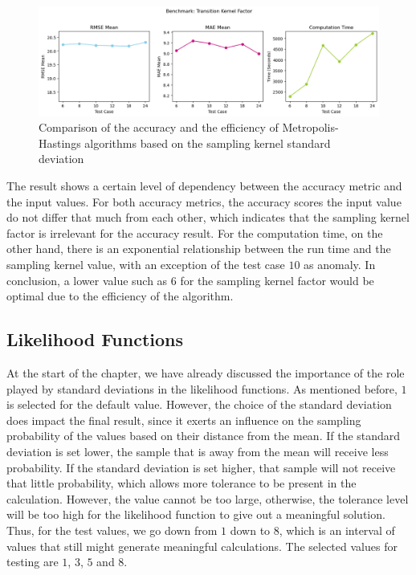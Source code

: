 \begin{figure}[H]
    \centering
    \includegraphics[width=1\textwidth]{figures/basic_mh/benchmark/sensitivity_transition.png}
    \captionsetup{width=.8\textwidth}
    \caption{Comparison of the accuracy and the efficiency of Metropolis-Hastings algorithms based on the sampling kernel standard deviation}
    \label{fig:enter-label}
\end{figure}

The result shows a certain level of dependency between the accuracy metric and the input values. For both accuracy metrics, the accuracy scores the input value do not differ that much from each other, which indicates that the sampling kernel factor is irrelevant for the accuracy result. For the computation time, on the other hand, there is an exponential relationship between the run time and the sampling kernel value, with an exception of the test case $10$ as anomaly. In conclusion, a lower value such as $6$ for the sampling kernel factor would be optimal due to the efficiency of the algorithm.

\subsection{Likelihood Functions}
At the start of the chapter, we have already discussed the importance of the role played by standard deviations in the likelihood functions. As mentioned before, $1$ is selected for the default value. However, the choice of the standard deviation does impact the final result, since it exerts an influence on the sampling probability of the values based on their distance from the mean. If the standard deviation is set lower, the sample that is away from the mean will receive less probability. If the standard deviation is set higher, that sample will not receive that little probability, which allows more tolerance to be present in the calculation. However, the value cannot be too large, otherwise, the tolerance level will be too high for the likelihood function to give out a meaningful solution. Thus, for the test values, we go down from $1$ down to $8$, which is an interval of values that still might generate meaningful calculations. The selected values for testing are $1$, $3$, $5$ and $8$. 

